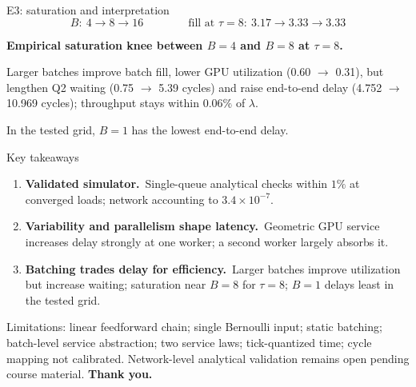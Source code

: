 \documentclass[aspectratio=169]{beamer}
\begin{document}
\begin{frame}{E3: saturation and interpretation}
  \centering
  {\large\[
    B:\ 4 \rightarrow 8 \rightarrow 16
    \qquad\qquad
    \text{fill at } \tau = 8:\ 3.17 \rightarrow 3.33 \rightarrow 3.33
  \]}
  \vfill
  \raggedright
  {\color{IndColor}\bfseries Empirical saturation knee between $B = 4$ and $B = 8$ at $\tau = 8$.}
  \medskip

  Larger batches \textcolor{IndColor}{improve batch fill}, \textcolor{PrColor}{lower GPU utilization} (0.60 $\rightarrow$ 0.31), but \textcolor{SecColor}{lengthen Q2 waiting} (0.75 $\rightarrow$ 5.39 cycles) and \textcolor{InkColor}{raise end-to-end delay} (4.752 $\rightarrow$ 10.969 cycles); throughput stays within $0.06\%$ of $\lambda$.
  \medskip

  In the tested grid, $B = 1$ has the lowest end-to-end delay.
\end{frame}

\begin{frame}{Key takeaways}
  \begin{enumerate}
    \item \textbf{\textcolor{PrColor}{Validated simulator.}}\ Single-queue analytical checks within $1\%$ at converged loads; network accounting to $3.4\times 10^{-7}$.
    \item \textbf{\textcolor{SecColor}{Variability and parallelism shape latency.}}\ Geometric GPU service increases delay strongly at one worker; a second worker largely absorbs it.
    \item \textbf{\textcolor{IndColor}{Batching trades delay for efficiency.}}\ Larger batches improve utilization but increase waiting; saturation near $B = 8$ for $\tau = 8$; $B = 1$ delays least in the tested grid.
  \end{enumerate}
  \vfill
  {\scriptsize\textcolor{MutedColor}{Limitations: linear feedforward chain; single Bernoulli input; static batching; batch-level service abstraction; two service laws; tick-quantized time; cycle mapping not calibrated. Network-level analytical validation remains open pending course material.}}  \vfill
  \centering\textbf{Thank you.}
\end{frame}
\end{document}
